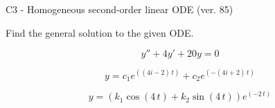 \begin{exercise}
  \begin{exerciseTitle}C3 - Homogeneous second-order linear ODE (ver. 85)\end{exerciseTitle}
  \begin{exerciseStatement}
    
Find the general solution to the given ODE.

    
\[y''+4y'+20y = 0\]

  \end{exerciseStatement}
  \begin{exerciseAnswer}
    
\[y= c_{1} e^{\left(\left(4 i - 2\right) \, t\right)} + c_{2} e^{\left(-\left(4 i + 2\right) \, t\right)}\]

    
\[y= {\left(k_{1} \cos\left(4 \, t\right) + k_{2} \sin\left(4 \, t\right)\right)} e^{\left(-2 \, t\right)}\]

  \end{exerciseAnswer}
\end{exercise}